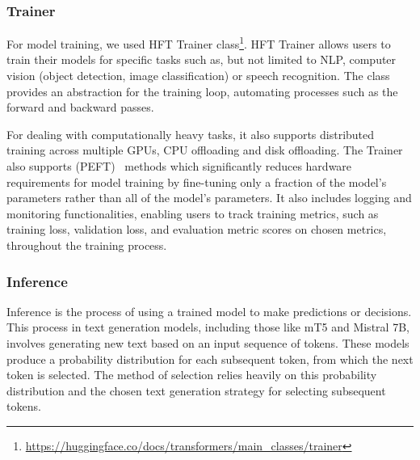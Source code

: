 \documentclass[english, ba, kiv, he, iso690numb, pdf, viewonly]{fasthesis}
\begin{document}
	\subsubsection{Trainer} \label{hf:trainer}
	For model training, we used HFT Trainer class\footnote{\url{https://huggingface.co/docs/transformers/main_classes/trainer}}. HFT Trainer allows users to train their models for specific tasks such as, but not limited to NLP, computer vision (object detection, image classification) or speech recognition.
	The class provides an abstraction for the training loop, automating processes such as the forward and backward passes.
	
	For dealing with computationally heavy tasks, it also supports distributed training across multiple GPUs, CPU offloading and disk offloading. The Trainer also supports  (PEFT)~\cite{peft} methods which significantly reduces hardware requirements for model training by fine-tuning only a fraction of the model's parameters rather than all of the model's parameters.
	It also includes logging and monitoring functionalities, enabling users to track training metrics, such as training loss, validation loss, and evaluation metric scores on chosen metrics, throughout the training process.
	
	\subsubsection{Inference}
	Inference is the process of using a trained model to make predictions or decisions.
	This process in text generation models, including those like mT5 and Mistral 7B, involves generating new text based on an input sequence of tokens. These models produce a probability distribution for each subsequent token, from which the next token is selected. The method of selection relies heavily on this probability distribution and the chosen text generation strategy for selecting subsequent tokens.
	
\end{document}
